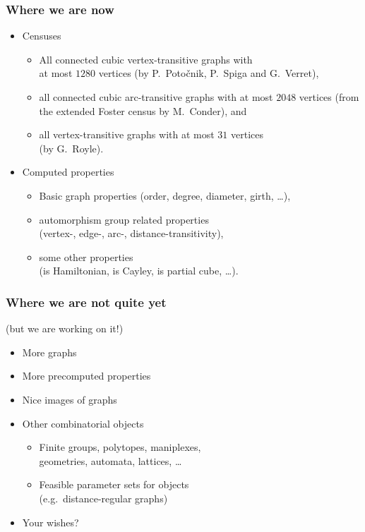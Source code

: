 \documentclass[usepdftitle=false]{beamer}
\newcommand{\defn}[1]{\textcolor{zoored}{\emph{#1}}}
\newcommand{\keyw}[1]{\textcolor{zooteal}{#1}}
\newcommand{\con}[1]{\textcolor{zoored}{#1}}
\begin{document}
\frame
{
    \frametitle{Where we are now}

    \begin{itemize}
    \itemsep=5mm
    \item \con{Censuses}
        \begin{itemize}
        \itemsep=3mm
        \item All connected \keyw{cubic vertex-transitive} graphs with \\
        at most \defn{$1280$} vertices (by P.~Potočnik, P.~Spiga and G.~Verret),
        \item all connected \keyw{cubic arc-transitive} graphs with at most
        \defn{$2048$} vertices (from the extended Foster census by M.~Conder),
        and
        \item all \keyw{vertex-transitive graphs} with at most \defn{$31$}
        vertices \\ (by G.~Royle).
        \end{itemize}
    \item \con{Computed properties}
        \begin{itemize}
        \itemsep=3mm
        \item Basic graph properties (\keyw{order}, \keyw{degree},
        \keyw{diameter}, \keyw{girth}, \dots),
        \item automorphism group related properties \\
        (\keyw{vertex-}, \keyw{edge-}, \keyw{arc-},
        \keyw{distance-transitivity}),
        \item some other properties \\
        (\keyw{is Hamiltonian}, \keyw{is Cayley}, \keyw{is partial cube},
        \dots).
        \end{itemize}
    \end{itemize}
}

\frame
{
    \frametitle{Where we are not quite yet}
    (but we are working on it!)
    \vskip 1cm

    \begin{itemize}
    \itemsep=5mm
    \item More graphs
    \item More precomputed properties
    \item Nice \keyw{images} of graphs
    \item Other combinatorial objects
        \begin{itemize}
        \itemsep=3mm
        \item \keyw{Finite groups}, \keyw{polytopes}, \keyw{maniplexes}, \\
        \keyw{geometries}, \keyw{automata}, \keyw{lattices}, \dots
        \item Feasible \keyw{parameter sets} for objects \\
        (e.g.~distance-regular graphs)
        \end{itemize}
    \item \con{Your wishes?}
    \end{itemize}
    \vskip 1cm
}
\end{document}
